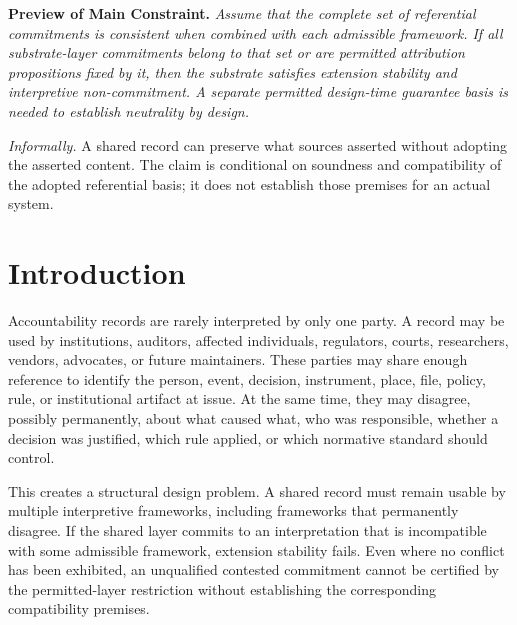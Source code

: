 \documentclass[11pt]{article}
\theoremstyle{plain}
\theoremstyle{definition}
\theoremstyle{remark}
\begin{document}

\bigskip
\noindent\textbf{Preview of Main Constraint.}
\emph{
  Assume that the complete set of referential commitments is
  consistent when combined with each admissible framework.
  If all substrate-layer commitments belong to that set or are
  permitted attribution propositions fixed by it, then the
  substrate satisfies extension stability and interpretive
  non-commitment.
  A separate permitted design-time guarantee basis is needed
  to establish neutrality by design.
}

\medskip
\noindent
\emph{Informally.} A shared record can preserve what sources asserted
without adopting the asserted content.
The claim is conditional on soundness and compatibility
of the adopted referential basis;
it does not establish those premises for an actual system.

\section{Introduction}
\label{sec:introduction}

Accountability records are rarely interpreted by only one party.
A record may be used by institutions, auditors, affected individuals,
regulators, courts, researchers, vendors, advocates, or future maintainers.
These parties may share enough reference to identify
the person, event, decision, instrument, place, file, policy, rule,
or institutional artifact at issue.
At the same time, they may disagree, possibly permanently,
about what caused what, who was responsible,
whether a decision was justified, which rule applied,
or which normative standard should control.

This creates a structural design problem.
A shared record must remain usable by multiple interpretive frameworks,
including frameworks that permanently disagree.
If the shared layer commits to an interpretation that is incompatible
with some admissible framework, extension stability fails.
Even where no conflict has been exhibited, an unqualified contested
commitment cannot be certified by the permitted-layer restriction
without establishing the corresponding compatibility premises.
\end{document}
